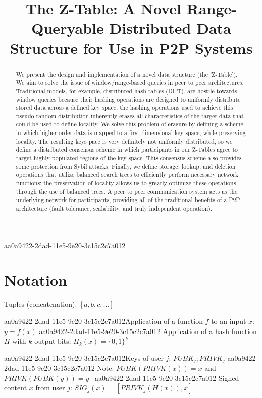 \documentclass[12pt]{article}
\title{The Z-Table: A Novel Range-Queryable Distributed Data Structure for Use in P2P Systems}
\begin{document}
aa0a9422-2dad-11e5-9e20-3c15c2c7a012\maketitle

\begin{abstract}
We present the design and implementation of a novel data structure (the 'Z-Table'). We aim to solve the issue of window/range-based queries in peer to peer architectures. Traditional models, for example,  distributed hash tables (DHT), are hostile towards window queries because their hashing operations are designed to uniformly distribute stored data across a defined key space; the hashing operations used to achieve this pseudo-random distribution inherently erases all characteristics of the target data that could be used to define locality. We solve this problem of erasure by defining a scheme in which higher-order data is mapped to a first-dimensional key space, while preserving locality. The resulting keys pace is very definitely not uniformly distributed, so we define a distributed consensus scheme in which participants in our Z-Tables agree to target highly populated regions of the key space. This consensus scheme also provides some protection from Sybil attacks. Finally, we define storage, lookup, and deletion operations that utilize balanced search trees to efficiently perform necessary network functions; the preservation of locality allows us to greatly optimize these operations through the use of balanced trees. A peer to peer communication system acts as the underlying network for participants, providing all of the traditional benefits of a P2P architecture (fault tolerance, scalability, and truly independent operation).
\end{abstract}

\section{Notation}

Tuples (concatenation): $[a,b,c,...]$

aa0a9422-2dad-11e5-9e20-3c15c2c7a012Application of a function $f$ to an input $x$: $y=f(x)$
aa0a9422-2dad-11e5-9e20-3c15c2c7a012
Application of a hash function $H$ with $k$ output bits: $H_{k}(x) = \{0,1\}^k$

aa0a9422-2dad-11e5-9e20-3c15c2c7a012Keys of user $j$: $ PUBK_j; PRIVK_j $
aa0a9422-2dad-11e5-9e20-3c15c2c7a012
Note: $PUBK(PRIVK(x)) = x$ and $PRIVK(PUBK(y)) = y$~
aa0a9422-2dad-11e5-9e20-3c15c2c7a012
Signed content $x$ from user $j$: $SIG_j(x) = \left[ PRIVK_j( H(x) ), x \right]$
\end{document}
